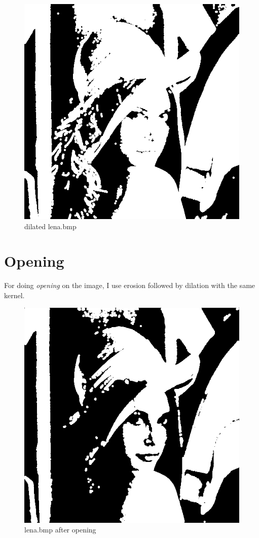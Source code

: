 \documentclass[14pt,a4paper]{extarticle}
\begin{document}
\begin{figure}[H]
\centering
\includegraphics[scale=0.6]{lena-dilated.bmp}
\caption{dilated lena.bmp}
\label{fig:lena-dilated.bmp}
\end{figure}

\section*{Opening}

For doing \textit{opening} on the image, I use erosion followed by dilation with the same kernel.

\begin{figure}[H]
\centering
\includegraphics[scale=0.6]{lena-opening.bmp}
\caption{lena.bmp after opening}
\label{fig:lena-opening.bmp}
\end{figure}
\end{document}
